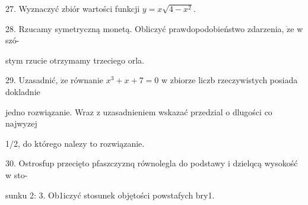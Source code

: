 \documentclass[a4paper,12pt]{article}
\begin{document}
27. Wyznaczyć zbiór wartości funkcji $y=x\sqrt{4-x^{2}}.$

28. Rzucamy symetryczną monetą. Obliczyć prawdopodobieństwo zdarzenia, $\dot{\mathrm{z}}\mathrm{e}$ w szó-

stym rzucie otrzymamy trzeciego orla.

29. Uzasadnić, $\dot{\mathrm{z}}\mathrm{e}$ równanie $x^{3}+x+7=0$ w zbiorze liczb rzeczywistych posiada dokladnie

jedno rozwiązanie. Wraz z uzasadnieniem wskazać przedzial o dlugości co najwyzej

1/2, do którego nalezy to rozwiązanie.

30. Ostrosfup przecięto pfaszczyznq równolegla do podstawy i dzielqcą wysokość w sto-

sunku 2: 3. Ob1iczyć stosunek objętości powstafych bry1.
\end{document}
